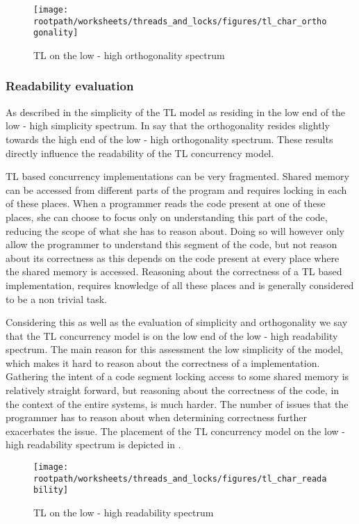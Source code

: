 \begin{figure}[htbp]
\centering
 \texttt{[image: \\rootpath/worksheets/threads\_and\_locks/figures/tl\_char\_orthogonality]} 
 \caption{\ac{TL} on the low - high orthogonality spectrum}
\label{fig:char_tl_orthogonality}
\end{figure}

\subsubsection{Readability evaluation}
As described in  the simplicity of the \ac{TL} model as residing in the low end of the low - high simplicity spectrum. In  say that the orthogonality resides slightly towards the high end of the low - high orthogonality spectrum. These results directly influence the readability of the \ac{TL} concurrency model.

\ac{TL} based concurrency implementations can be very fragmented. Shared memory can be accessed from different parts of the program and requires locking in each of these places. When a programmer reads the code present at one of these places, she can choose to focus only on understanding this part of the code, reducing the scope of what she has to reason about. Doing so will however only allow the programmer to understand this segment of the code, but not reason about its correctness as this depends on the code present at every place where the shared memory is accessed. Reasoning about the correctness of a \ac{TL} based implementation, requires knowledge of all these places and is generally considered to be a non trivial task.

Considering this as well as the evaluation of simplicity and orthogonality we say that the \ac{TL} concurrency model is on the low end of the low - high readability spectrum. The main reason for this assessment the low simplicity of the model, which makes it hard to reason about the correctness of a implementation. Gathering the intent of a code segment locking access to some shared memory is relatively straight forward, but reasoning about the correctness of the code, in the context of the entire systems, is much harder. The number of issues that the programmer has to reason about when determining correctness further exacerbates the issue. The placement of the \ac{TL} concurrency model on the low - high readability spectrum is depicted in .

\begin{figure}[htbp]
\centering
 \texttt{[image: \\rootpath/worksheets/threads\_and\_locks/figures/tl\_char\_readability]} 
 \caption{\ac{TL} on the low - high readability spectrum}
\label{fig:char_tl_readability}
\end{figure}

